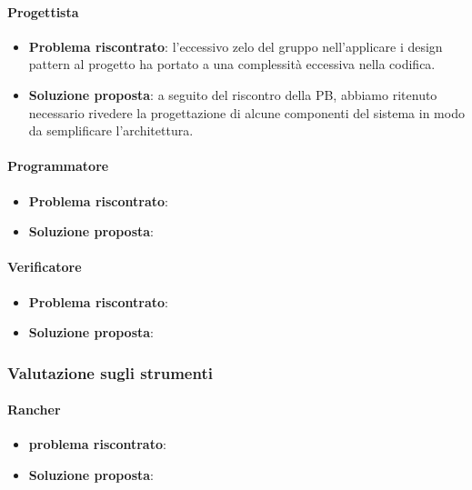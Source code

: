        \paragraph{Progettista}
            \begin{itemize}
                \item \textbf{Problema riscontrato}: l'eccessivo zelo del gruppo nell'applicare i design pattern al progetto ha portato a una complessità eccessiva nella codifica.
                \item \textbf{Soluzione proposta}: a seguito del riscontro della PB, abbiamo ritenuto necessario rivedere la progettazione di alcune componenti del sistema in modo da semplificare l'architettura.
            \end{itemize}

        \paragraph{Programmatore}
            \begin{itemize}
                \item \textbf{Problema riscontrato}:
                \item \textbf{Soluzione proposta}:
            \end{itemize}

        \paragraph{Verificatore}
            \begin{itemize}
                \item \textbf{Problema riscontrato}:
                \item \textbf{Soluzione proposta}:
            \end{itemize}

    \subsubsection{Valutazione sugli strumenti}

        \paragraph{Rancher}
            \begin{itemize}
                \item \textbf{problema riscontrato}:
                \item \textbf{Soluzione proposta}: 
            \end{itemize}



